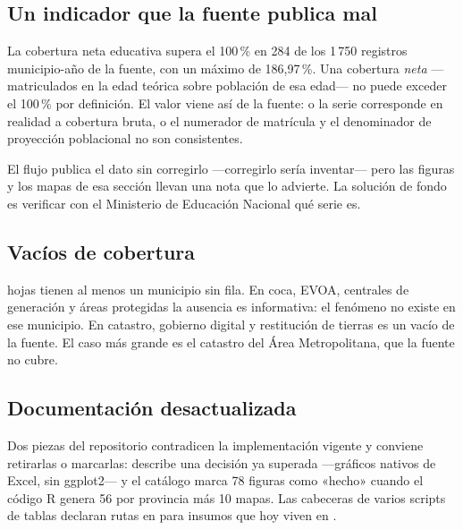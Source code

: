 \documentclass[11pt,a4paper]{article}
\begin{document}
\subsection{Un indicador que la fuente publica mal}

\begin{hallazgo}[title={Cobertura neta por encima del 100\,\%}]
La cobertura neta educativa supera el 100\,\% en 284 de los 1\,750 registros
municipio-año de la fuente, con un máximo de 186,97\,\%. Una cobertura
\emph{neta} —matriculados en la edad teórica sobre población de esa edad— no
puede exceder el 100\,\% por definición. El valor viene así de la fuente: o la
serie corresponde en realidad a cobertura bruta, o el numerador de matrícula y
el denominador de proyección poblacional no son consistentes.

El flujo publica el dato sin corregirlo —corregirlo sería inventar— pero las
figuras y los mapas de esa sección llevan una nota que lo advierte. La solución
de fondo es verificar con el Ministerio de Educación Nacional qué serie es.
\end{hallazgo}

\subsection{Vacíos de cobertura}

\cifraHojasConVacios{} hojas tienen al menos un municipio sin fila. En coca,
EVOA, centrales de generación y áreas protegidas la ausencia es informativa: el
fenómeno no existe en ese municipio. En catastro, gobierno digital y restitución
de tierras es un vacío de la fuente. El caso más grande es el catastro del Área
Metropolitana, que la fuente no cubre.

\subsection{Documentación desactualizada}

Dos piezas del repositorio contradicen la implementación vigente y conviene
retirarlas o marcarlas:  describe
una decisión ya superada —gráficos nativos de Excel, sin ggplot2— y el catálogo
 marca 78 figuras como «hecho» cuando el código R
genera 56 por provincia más 10 mapas. Las cabeceras de varios scripts de tablas
declaran rutas en  para insumos que hoy viven en
.

\end{document}

